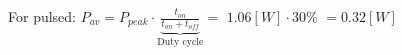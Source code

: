 \documentclass[preview]{standalone}
\begin{document}
\begin{center}
For pulsed: $P_{av} = P_{peak} \cdot \underbrace{\frac{t_{on}}{t_{on}+t_{off}}}_{\text{Duty cycle}}=$ $1.06 [W] \cdot 30 \%$ $= 0.32 [W]$
\end{center}
\end{document}
